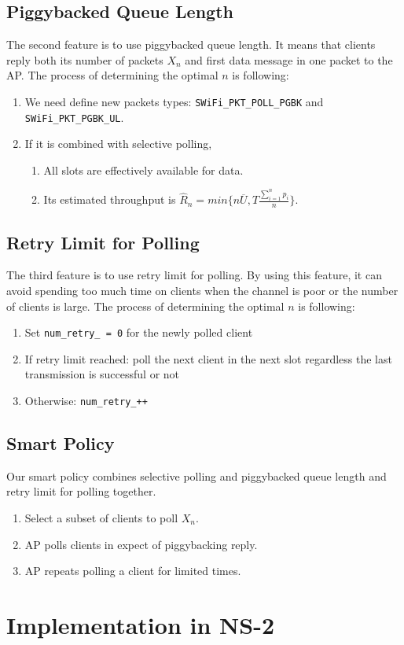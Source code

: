 \documentclass{article}
\begin{document}
\subsection{Piggybacked Queue Length}

The second feature is to use piggybacked queue length. It means that clients reply both its number of packets $X_n$ and first data message in one packet to the AP. The process of determining the optimal $n$ is following:
\begin{enumerate}
\item We need define new packets types: \lstinline|SWiFi_PKT_POLL_PGBK| and \lstinline|SWiFi_PKT_PGBK_UL|. 
\item If it is combined with selective polling,
     \begin{enumerate} 
     \item All slots are effectively available for data.
     \item Its estimated throughput is $\hat{R}_n = min \{ n\overline{U}, T \frac{\sum_{i=1}^{n}p_i}{n} \}$. 
     \end{enumerate}
\end{enumerate}

\subsection{Retry Limit for Polling}

The third feature is to use retry limit for polling. By using this feature, it can avoid spending too much time on clients when the channel is poor or the number of clients is large. The process of determining the optimal $n$ is following:
\begin{enumerate}
\item Set \lstinline|num_retry_ = 0| for the newly polled client
\item If retry limit reached: poll the next client in the next slot regardless the last transmission is successful or not
\item Otherwise: \lstinline|num_retry_++|
\end{enumerate}

\subsection{Smart Policy}
Our smart policy combines selective polling and piggybacked queue length and retry limit for polling together. 
\begin{enumerate}
\item Select a subset of clients to poll $X_n$.
\item AP polls clients in expect of piggybacking reply.
\item AP repeats polling a client for limited times.
\end{enumerate}

\section{Implementation in NS-2}
\label{section: ns2}
\end{document}
